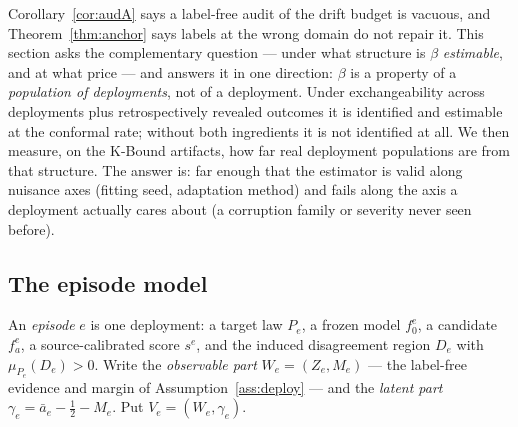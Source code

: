%

\providecommand{\Var}{\operatorname{Var}}

Corollary~\ref{cor:audA} says a label-free audit of the drift budget is vacuous, and
Theorem~\ref{thm:anchor} says labels at the wrong domain do not repair it. This section asks the
complementary question --- under what structure is $\beta$ \emph{estimable}, and at what price ---
and answers it in one direction: $\beta$ is a property of a \emph{population of deployments}, not of
a deployment. Under exchangeability across deployments plus retrospectively revealed outcomes it is
identified and estimable at the conformal rate; without both ingredients it is not identified at
all. We then measure, on the K-Bound artifacts, how far real deployment populations are from that
structure. The answer is: far enough that the estimator is valid along nuisance axes (fitting seed,
adaptation method) and fails along the axis a deployment actually cares about (a corruption family
or severity never seen before).

\subsection{The episode model}

\begin{definition}\label{epi:def-episode}
An \emph{episode} $e$ is one deployment: a target law $P_e$, a frozen model $f_0^e$, a candidate
$f_a^e$, a source-calibrated score $s^e$, and the induced disagreement region $D_e$ with
$\mu_{P_e}(D_e)>0$. Write the \emph{observable part}
$W_e=(Z_e,M_e)$ --- the label-free evidence and margin of Assumption~\ref{ass:deploy} --- and the
\emph{latent part} $\gamma_e=\bar a_e-\tfrac12-M_e$. Put $V_e=(W_e,\gamma_e)$.
\end{definition}

